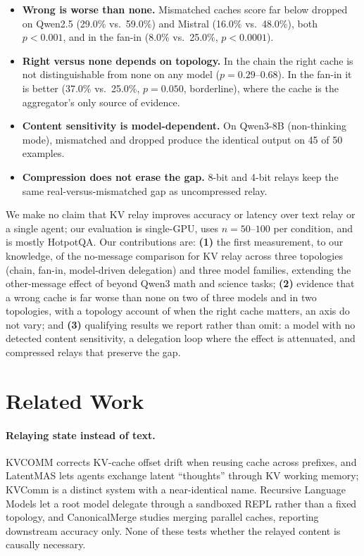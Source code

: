 \documentclass[11pt]{article}
\begin{document}
\begin{itemize}[leftmargin=*,itemsep=1pt,topsep=2pt]
\item \textbf{Wrong is worse than none.} Mismatched caches score far
below dropped on Qwen2.5 (29.0\% vs.\ 59.0\%) and Mistral (16.0\% vs.\
48.0\%), both $p<0.001$, and in the fan-in (8.0\% vs.\ 25.0\%,
$p<0.0001$).
\item \textbf{Right versus none depends on topology.} In the chain the
right cache is not distinguishable from none on any model
($p=0.29$--$0.68$). In the fan-in it is better (37.0\% vs.\ 25.0\%,
$p=0.050$, borderline), where the cache is the aggregator's only source
of evidence.
\item \textbf{Content sensitivity is model-dependent.} On Qwen3-8B
(non-thinking mode), mismatched and dropped produce the identical output
on 45 of 50 examples.
\item \textbf{Compression does not erase the gap.} 8-bit and 4-bit
relays keep the same real-versus-mismatched gap as uncompressed relay.
\end{itemize}

We make no claim that KV relay improves accuracy or latency over text
relay or a single agent; our evaluation is single-GPU, uses $n{=}50$--$100$
per condition, and is mostly HotpotQA. Our contributions are:
\textbf{(1)} the first measurement, to our knowledge, of the no-message
comparison for KV relay across three topologies (chain, fan-in, model-driven
delegation) and three model families, extending the other-message effect
of \citet{zhangemu2026} beyond Qwen3 math and science tasks;
\textbf{(2)} evidence that a wrong cache is far worse than none on two of
three models and in two topologies, with a topology account of when the
right cache matters, an axis \citet{zhangemu2026} do not vary; and
\textbf{(3)} qualifying results we report rather than omit: a model with
no detected content sensitivity, a delegation loop where the effect is
attenuated, and compressed relays that preserve the gap.

\section{Related Work}
\label{sec:related}

\paragraph{Relaying state instead of text.} KVCOMM \citep{kvcomm2025}
corrects KV-cache offset drift when reusing cache across prefixes, and
LatentMAS \citep{latentmas2026} lets agents exchange latent ``thoughts''
through KV working memory; KVComm \citep{shikvcomm2025} is a distinct
system with a near-identical name. Recursive Language Models
\citep{rlm2026} let a root model delegate through a sandboxed REPL
rather than a fixed topology, and CanonicalMerge
\citep{canonicalmerge2026} studies merging parallel caches, reporting
downstream accuracy only. None of these tests whether the relayed
content is causally necessary.
\end{document}
